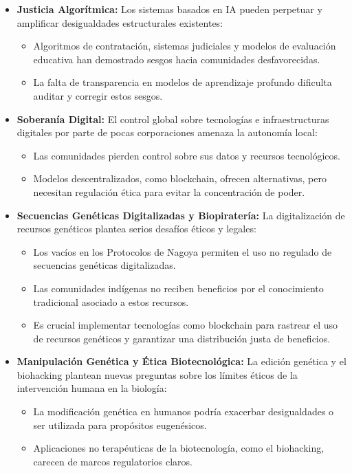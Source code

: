 \begin{refsection}
\begin{itemize}
\item \textbf{Justicia Algorítmica:}  
Los sistemas basados en IA pueden perpetuar y amplificar desigualdades estructurales existentes:
\begin{itemize}
    \item Algoritmos de contratación, sistemas judiciales y modelos de evaluación educativa han demostrado sesgos hacia comunidades desfavorecidas.
    \item La falta de transparencia en modelos de aprendizaje profundo dificulta auditar y corregir estos sesgos.
\end{itemize}

\item \textbf{Soberanía Digital:}  
El control global sobre tecnologías e infraestructuras digitales por parte de pocas corporaciones amenaza la autonomía local:
\begin{itemize}
    \item Las comunidades pierden control sobre sus datos y recursos tecnológicos.
    \item Modelos descentralizados, como blockchain, ofrecen alternativas, pero necesitan regulación ética para evitar la concentración de poder.
\end{itemize}

\item \textbf{Secuencias Genéticas Digitalizadas y Biopiratería:}  
La digitalización de recursos genéticos plantea serios desafíos éticos y legales:
\begin{itemize}
    \item Los vacíos en los Protocolos de Nagoya permiten el uso no regulado de secuencias genéticas digitalizadas.
    \item Las comunidades indígenas no reciben beneficios por el conocimiento tradicional asociado a estos recursos.
    \item Es crucial implementar tecnologías como blockchain para rastrear el uso de recursos genéticos y garantizar una distribución justa de beneficios.
\end{itemize}

\item \textbf{Manipulación Genética y Ética Biotecnológica:}  
La edición genética y el biohacking plantean nuevas preguntas sobre los límites éticos de la intervención humana en la biología:
\begin{itemize}
    \item La modificación genética en humanos podría exacerbar desigualdades o ser utilizada para propósitos eugenésicos.
    \item Aplicaciones no terapéuticas de la biotecnología, como el biohacking, carecen de marcos regulatorios claros.
\end{itemize}


\end{itemize}
\end{refsection}
